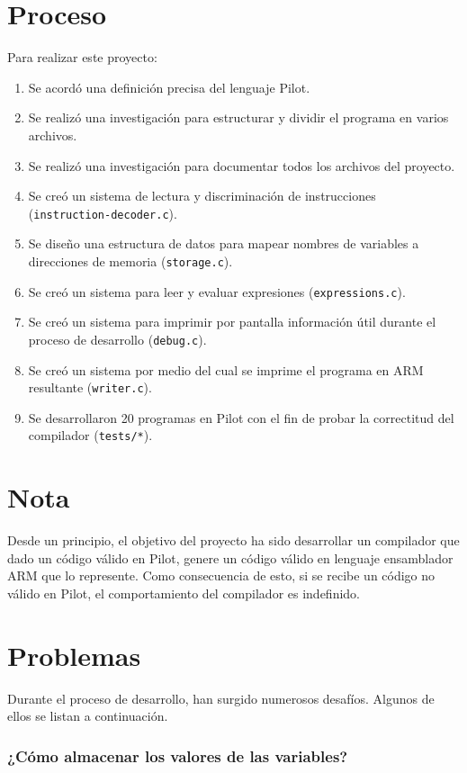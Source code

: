\documentclass[12pt,spanish]{article}
\begin{document}
\section{Proceso}
Para realizar este proyecto:
\begin{enumerate}
\item{Se acordó una definición precisa del lenguaje Pilot.}
\item{Se realizó una investigación para estructurar y dividir el programa en varios archivos.}
\item{Se realizó una investigación para documentar todos los archivos del proyecto.}
\item{Se creó un sistema de lectura y discriminación de instrucciones (\texttt{instruction-decoder.c}).}
\item{Se diseño una estructura de datos para mapear nombres de variables a direcciones de memoria (\texttt{storage.c}).}
\item{Se creó un sistema para leer y evaluar expresiones (\texttt{expressions.c}).}
\item{Se creó un sistema para imprimir por pantalla información útil durante el proceso de desarrollo (\texttt{debug.c}).}
\item{Se creó un sistema por medio del cual se imprime el programa en ARM resultante (\texttt{writer.c}).}
\item{Se desarrollaron 20 programas en Pilot con el fin de probar la correctitud del compilador (\texttt{tests/*}).}
\end{enumerate}

\section{Nota}
Desde un principio, el objetivo del proyecto ha sido desarrollar un compilador que dado un código válido en Pilot, genere un código válido en lenguaje ensamblador ARM que lo represente. Como consecuencia de esto, si se recibe un código no válido en Pilot, el comportamiento del compilador es indefinido.

\section{Problemas}
Durante el proceso de desarrollo, han surgido numerosos desafíos. Algunos de ellos se listan a continuación.
\subsubsection{¿Cómo almacenar los valores de las variables?}
\end{document}
